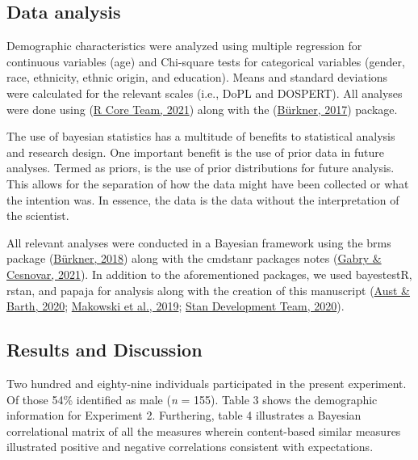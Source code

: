 \documentclass[
  donotrepeattitle,doc, 12pt, a4paper,floatsintext]{apa7}
\begin{document}
\hypertarget{data-analysis-4}{%
\subsection{Data analysis}\label{data-analysis-4}}

Demographic characteristics were analyzed using multiple regression for continuous variables (age) and Chi-square tests for categorical variables (gender, race, ethnicity, ethnic origin, and education). Means and standard deviations were calculated for the relevant scales (i.e., DoPL and DOSPERT). All analyses were done using (\protect\hyperlink{ref-rcoreteam2021}{R Core Team, 2021}) along with the (\protect\hyperlink{ref-burkner2017}{Bürkner, 2017}) package.

The use of bayesian statistics has a multitude of benefits to statistical analysis and research design. One important benefit is the use of prior data in future analyses. Termed as priors, is the use of prior distributions for future analysis. This allows for the separation of how the data might have been collected or what the intention was. In essence, the data is the data without the interpretation of the scientist.

All relevant analyses were conducted in a Bayesian framework using the brms package (\protect\hyperlink{ref-burkner2018}{Bürkner, 2018}) along with the cmdstanr packages notes (\protect\hyperlink{ref-gabry2021}{Gabry \& Cesnovar, 2021}). In addition to the aforementioned packages, we used bayestestR, rstan, and papaja for analysis along with the creation of this manuscript (\protect\hyperlink{ref-aust2020}{Aust \& Barth, 2020}; \protect\hyperlink{ref-makowski2019}{Makowski et al., 2019}; \protect\hyperlink{ref-standevelopmentteam2020}{Stan Development Team, 2020}).

\hypertarget{results-and-discussion-1}{%
\subsection{Results and Discussion}\label{results-and-discussion-1}}

Two hundred and eighty-nine individuals participated in the present experiment. Of those 54\% identified as male (\emph{n} = 155). Table 3 shows the demographic information for Experiment 2. Furthering, table 4 illustrates a Bayesian correlational matrix of all the measures wherein content-based similar measures illustrated positive and negative correlations consistent with expectations.
\end{document}

